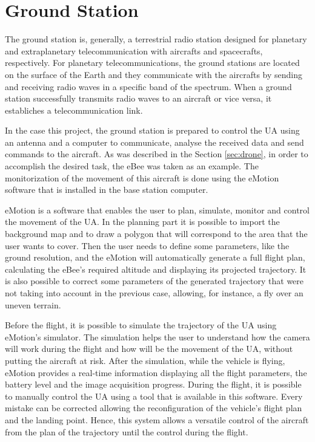 \section{Ground Station}\label{sec:gs}

The ground station is, generally, a terrestrial radio station designed for planetary and extraplanetary telecommunication with aircrafts and spacecrafts, respectively. For planetary telecommunications, the ground stations are located on the surface of the Earth and they communicate with the aircrafts by sending and receiving radio waves in a specific band of the spectrum. When a ground station successfully transmits radio waves to an aircraft or vice versa, it establiches a telecommunication link.

In the case this project, the ground station is prepared to control the UA using an antenna and a computer to communicate, analyse the received data and send commands to the aircraft. As was described in the Section \ref{sec:drone}, in order to accomplish the desired task, the eBee was taken as an example. The monitorization of the movement of this aircraft is done using the eMotion software that is installed in the base station computer.

eMotion is a software that enables the user to plan, simulate, monitor and control the movement of the UA. In the planning part it is possible to import the background map and to draw a polygon that will correspond to the area that the user wants to cover. Then the user needs to define some parameters, like the ground resolution, and the eMotion will automatically generate a full flight plan, calculating the eBee’s required altitude and displaying its projected trajectory. It is also possible to correct some parameters of the generated trajectory that were not taking into account in the previous case, allowing, for instance, a fly over an uneven terrain.

Before the flight, it is possible to simulate the trajectory of the UA using eMotion's simulator. The simulation helps the user to understand how the camera will work during the flight and how will be the movement of the UA, without putting the aircraft at risk. After the simulation, while the vehicle is flying, eMotion provides a real-time information displaying all the flight parameters, the battery level and the image acquisition progress. During the flight, it is possible to manually control the UA using a tool that is available in this software. Every mistake can be corrected allowing the reconfiguration of the vehicle's flight plan and the landing point. Hence, this system allows a versatile control of the aircraft from the plan of the trajectory until the control during the flight.